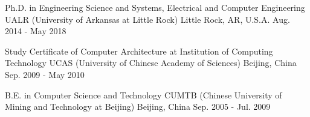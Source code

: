 

\begin{cventries}

%

  \cventry
    {Ph.D. in Engineering Science and Systems, Electrical and Computer Engineering} %
    {UALR (University of Arkansas at Little Rock)} %
    {Little Rock, AR, U.S.A.} %
    {Aug. 2014 - May 2018} %
    {
   }

\vspace{-0.25cm}
  \cventry
{Study Certificate of Computer Architecture at Institution of Computing Technology} %
{UCAS (University of Chinese Academy of Sciences)} %
{Beijing, China} %
{Sep. 2009 - May 2010} %
{
}

\vspace{-0.25cm}

\cventry
{B.E. in Computer Science and Technology} %
{CUMTB (Chinese University of Mining and Technology at Beijing)} %
{Beijing, China} %
{Sep. 2005 - Jul. 2009} %
{
}

\vspace{-0.25cm}

\end{cventries}
